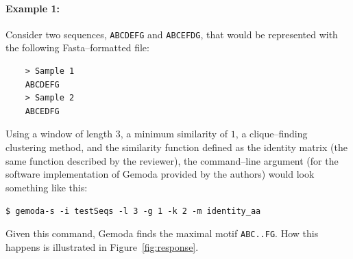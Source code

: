         \paragraph{Example 1:}
    Consider two sequences,
    \texttt{ABCDEFG} and \texttt{ABCEFDG}, that would be represented with
    the following Fasta--formatted file:
    \begin{verbatim}
    > Sample 1
    ABCDEFG
    > Sample 2
    ABCEDFG\end{verbatim}
    Using a window of length $3$,
    a minimum similarity of $1$, a clique--finding clustering method, and
    the similarity function defined as the identity matrix (the same
    function described by the reviewer), the command--line argument (for
    the software implementation of Gemoda provided by the authors) would
    look something like this:

    \bigskip
    \texttt{\$ gemoda-s -i testSeqs -l 3 -g 1 -k 2 -m identity\_aa}
    \bigskip

    Given this command,
    Gemoda finds the maximal motif \texttt{ABC..FG}.  How this
    happens is illustrated in Figure~\vref{fig:response}.

